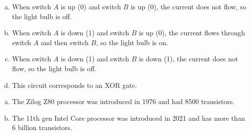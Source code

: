 \documentclass[12pt]{extarticle}
\begin{document}
\begin{enumerate}[(a)]
\item When switch $A$ is up (0) and switch $B$ is up (0), the current does not flow, so the light bulb is off.
\item When switch $A$ is down (1) and switch $B$ is up (0), the current flows through switch $A$ and then switch $B$, so the light bulb is on.
\item When switch $A$ is down (1) and switch $B$ is down (1), the current does not flow, so the light bulb is off.
\item This circuit corresponds to an XOR gate.
\end{enumerate}


\begin{enumerate}[(a)]
\item The Zilog Z80 processor was introduced in 1976 and had 8500 transistors.
\item The 11th gen Intel Core processor was introduced in 2021 and has more than 6 billion transistors.
\end{enumerate}




\printbibliography
\end{document}
